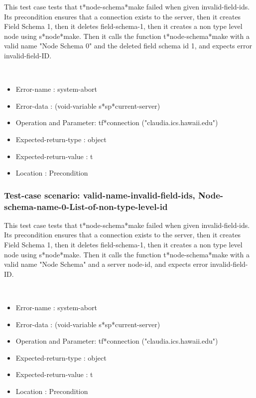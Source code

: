 This test case tests that t*node-schema*make failed when given invalid-field-ids.
Its precondition ensures that a connection exists to the server, then it creates Field Schema 1, then it deletes field-schema-1, then it creates a non type level node using s*node*make.
Then it calls the function t*node-schema*make  with a valid name "Node Schema 0" and the deleted field schema id 1, and expects error invalid-field-ID.



\
\begin {itemize}
\item 	Error-name             : system-abort
\item Error-data             : (void-variable s*sp*current-server)
\item Operation and Parameter: tf*connection ("claudia.ics.hawaii.edu")
\item Expected-return-type   : object
\item Expected-return-value  : t
\item Location               : Precondition



\end {itemize}
\subsubsection {Test-case scenario: valid-name-invalid-field-ids, Node-schema-name-0-List-of-non-type-level-id}


This test case tests that t*node-schema*make failed when given invalid-field-ids.
Its precondition ensures that a connection exists to the server, then it creates Field Schema 1, then it deletes field-schema-1, then it creates a non type level node using s*node*make.
Then it calls the function t*node-schema*make  with a valid name "Node Schema" and a server node-id, and expects error invalid-field-ID.



\
\begin {itemize}
\item 	Error-name             : system-abort
\item Error-data             : (void-variable s*sp*current-server)
\item Operation and Parameter: tf*connection ("claudia.ics.hawaii.edu")
\item Expected-return-type   : object
\item Expected-return-value  : t
\item Location               : Precondition



\end {itemize}
